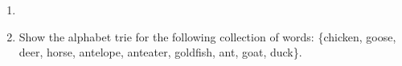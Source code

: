 \documentclass[12pt,a4paper]{article}
\makeatletter
\newtheorem*{solution}{Solution}
\theoremstyle{definition}
\renewenvironment{solution}[1][Solution] {\par\pushQED{\qed}\normalfont\topsep6\p@\@plus6\p@\relax\trivlist\item[\hskip\labelsep\bfseries#1\@addpunct{.}]\ignorespaces}{\popQED\endtrivlist\@endpefalse} \makeatother
\makeatother
\begin{document}
\begin{enumerate}
\begin{solution}
\begin{figure}[htbp]
	
	\centering
\end{figure}


	\end{solution}

\newpage
\item  Show the alphabet trie for the following collection of words: \{chicken, goose, deer, horse, antelope, anteater, goldfish, ant, goat, duck\}.


\end{enumerate}
\end{document}
